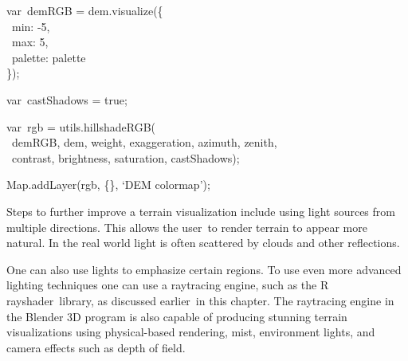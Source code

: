 \documentclass[
  letterpaper,
  DIV=11,
  numbers=noendperiod]{scrreprt}
\begin{document}
var~demRGB = dem.visualize(\{\\
\hspace*{0.333em} ~min: -5,\\
\hspace*{0.333em} ~max: 5,\\
\hspace*{0.333em} ~palette: palette\\
\});

var~castShadows = true;

var~rgb = utils.hillshadeRGB(\\
\hspace*{0.333em} ~demRGB, dem, weight, exaggeration, azimuth, zenith,\\
\hspace*{0.333em} ~contrast, brightness, saturation, castShadows);

Map.addLayer(rgb, \{\}, `DEM colormap');

Steps to further improve a terrain visualization include using light
sources from multiple directions. This allows the user~to render terrain
to appear more natural. In the real world light is often scattered by
clouds and other reflections.

One can also use lights to emphasize certain regions. To use even more
advanced lighting techniques one can use a raytracing engine, such as
the R rayshader~library, as discussed earlier~in this chapter. The
raytracing engine in the Blender 3D program is also capable of producing
stunning terrain visualizations using physical-based rendering, mist,
environment lights, and camera effects such as depth of field.
\end{document}

